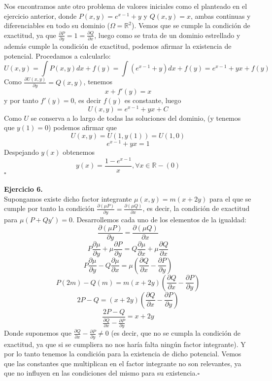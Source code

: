 \documentclass[fleqn]{article}
\newcommand*{\QED}{\hfill\ensuremath{\square}}
\begin{document}
    Nos encontramos ante otro problema de valores iniciales como el planteado en el ejercicio anterior, donde $P(x,y)=e^{x-1} + y$ y $Q(x,y)=x$, 
    ambas continuas y diferenciables en todo su dominio ($\Omega = \mathds{R}^2$). Vemos que se cumple la condición de exactitud, ya que 
    $\frac{\partial P}{\partial y}=1=\frac{\partial Q}{\partial x}$, luego como se trata de un dominio estrellado y además 
    cumple la condición de exactitud, podemos afirmar la existencia de potencial. Procedamos a calcularlo:
    $$U(x,y)=\int P(x,y) dx +f(y)= \int (e^{x-1} + y)dx + f(y) = e^{x-1} + yx + f(y)$$
    Como $\frac{\partial U(x,y)}{\partial y}=Q(x,y)$, tenemos
    $$x + f'(y)=x$$
    y por tanto $f'(y)=0$, es decir $f(y)$ es constante, luego
    $$U(x,y)=e^{x-1} + yx + C$$
    Como $U$ se conserva a lo largo de todas las soluciones del dominio, (y tenemos que $y(1)=0$) podemos afirmar que
    $$U(x,y)=U(1,y(1))=U(1,0)$$
    $$e^{x-1} + yx = 1$$
    Despejando $y(x)$ obtenemos
    $$y(x)=\frac{1-e^{x-1}}{x}, \forall x \in \mathds{R}-(0)$$ 
    \QED \\ \\

    {\bf{Ejercicio 6.}} \\

    Supongamos existe dicho factor integrante $\mu(x,y)=m(x+2y)$ para el que se cumple por tanto la condición 
    $\frac{\partial (\mu P)}{\partial y}=\frac{\partial (\mu Q)}{\partial x}$, es decir, la condición de exactitud para
    $\mu (P + Qy')=0$. Desarrollemos cada uno de los elementos de la igualdad:
    $$\frac{\partial (\mu P)}{\partial y}=\frac{\partial (\mu Q)}{\partial x}$$
    $$P\frac{\partial \mu}{\partial y} + \mu \frac{\partial P}{\partial y}=Q\frac{\partial \mu}{\partial x} + \mu \frac{\partial Q}{\partial x}$$
    $$P\frac{\partial \mu}{\partial y}-Q\frac{\partial \mu}{\partial x}=\mu (\frac{\partial Q}{\partial x}-\frac{\partial P}{\partial y})$$
    $$P(2m)-Q(m)=m(x+2y) (\frac{\partial Q}{\partial x}-\frac{\partial P}{\partial y})$$
    $$2P-Q=(x+2y) (\frac{\partial Q}{\partial x}-\frac{\partial P}{\partial y})$$
    $$\frac{2P-Q}{\frac{\partial Q}{\partial x}-\frac{\partial P}{\partial y}}=x+2y $$
    Donde suponemos que $\frac{\partial Q}{\partial x}-\frac{\partial P}{\partial y} \neq 0$ (es decir, que no se cumpla la condición de exactitud,
    ya que si se cumpliera no nos haría falta ningún factor integrante). Y por lo tanto tenemos la condición para la existencia de dicho potencial.
    Vemos que las constantes que multiplican en el factor integrante no son relevantes, ya que no influyen en las condiciones del mismo 
    para su existencia.\QED \\ \\
    
\end{document}
